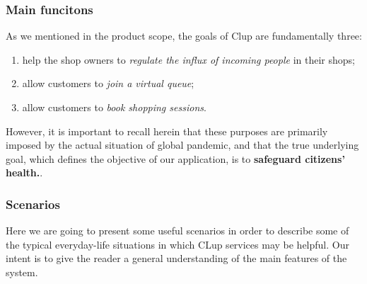 \subsubsection{Main funcitons}
\label{subsect:mainfunctions}

As we mentioned in the product scope, the goals of Clup are fundamentally three: 
\begin{enumerate}[topsep=0pt]
    \item help the shop owners to \textit{regulate the influx of incoming people} in their shops;
    \item allow customers to \textit{join a virtual queue};
    \item allow customers to \textit{book shopping sessions}.
\end{enumerate}

However, it is important to recall herein that these purposes are primarily imposed by the actual situation of global pandemic, and that the true underlying goal, which defines the objective of our application, is to \textbf{safeguard citizens' health.}. 

\subsubsection{Scenarios}
\label{subsubsect:scenarios}

Here we are going to present some useful scenarios in order to describe some of the typical everyday-life situations in which CLup services may be helpful. Our intent is to give the reader a general understanding of the main features of the system.
 
